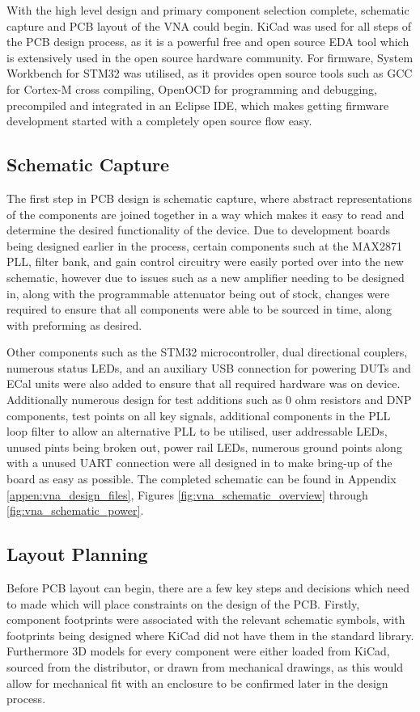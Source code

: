 With the high level design and primary component selection complete, schematic capture and PCB layout of the VNA could begin. KiCad was used for all steps of the PCB design process, as it is a powerful free and open source EDA tool which is extensively used in the open source hardware community. For firmware, System Workbench for STM32 was utilised, as it provides open source tools such as GCC for Cortex-M cross compiling, OpenOCD for programming and debugging, precompiled and integrated in an Eclipse IDE, which makes getting firmware development started with a completely open source flow easy.

\subsection{Schematic Capture}
The first step in PCB design is schematic capture, where abstract representations of the components are joined together in a way which makes it easy to read and determine the desired functionality of the device. Due to development boards being designed earlier in the process, certain components such at the MAX2871 PLL, filter bank, and gain control circuitry were easily ported over into the new schematic, however due to issues such as a new amplifier needing to be designed in, along with the programmable attenuator being out of stock, changes were required to ensure that all components were able to be sourced in time, along with preforming as desired.

Other components such as the STM32 microcontroller, dual directional couplers, numerous status LEDs, and an auxiliary USB connection for powering DUTs and ECal units were also added to ensure that all required hardware was on device. Additionally numerous design for test additions such as 0 ohm resistors and DNP components, test points on all key signals, additional components in the PLL loop filter to allow an alternative PLL to be utilised, user addressable LEDs, unused pints being broken out, power rail LEDs, numerous ground points along with a unused UART connection were all designed in to make bring-up of the board as easy as possible. The completed schematic can be found in Appendix \ref{appen:vna_design_files}, Figures \ref{fig:vna_schematic_overview} through \ref{fig:vna_schematic_power}.

\subsection{Layout Planning}
Before PCB layout can begin, there are a few key steps and decisions which need to made which will place constraints on the design of the PCB. Firstly, component footprints were associated with the relevant schematic symbols, with footprints being designed where KiCad did not have them in the standard library. Furthermore 3D models for every component were either loaded from KiCad, sourced from the distributor, or drawn from mechanical drawings, as this would allow for mechanical fit with an enclosure to be confirmed later in the design process. 

